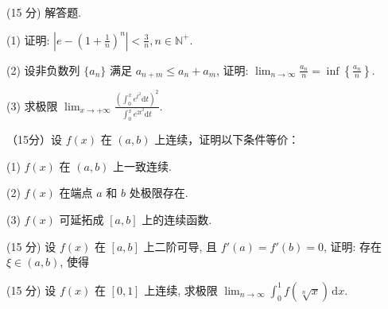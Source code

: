 \par{}
(15 分) 解答题.\par
(1) 证明: $\left|e - \left(1 + \frac{1}{n}\right)^n\right| < \frac{3}{n}, n \in \mathbb{N}^+$.\par
(2) 设非负数列 $\{a_{n}\}$ 满足 $a_{n + m} \leq a_{n} + a_{m}$, 证明: $\lim_{n \to \infty} \frac{a_{n}}{n} = \inf \left\{\frac{a_{n}}{n}\right\}$.\par
(3) 求极限 $\lim_{x\to +\infty}\frac{\left(\int_0^xe^{t^2}\mathrm{d}t\right)^2}{\int_0^xe^{2t^2}\mathrm{d}t}.$\par
\par{}
（15分）设 $f(x)$ 在 $(a,b)$ 上连续，证明以下条件等价：\par
(1) $f(x)$ 在 $(a, b)$ 上一致连续.\par
(2) $f(x)$ 在端点 $a$ 和 $b$ 处极限存在.\par
(3) $f(x)$ 可延拓成 $[a, b]$ 上的连续函数.\par
\par{}
\par{}
(15 分) 设 $f(x)$ 在 $[a, b]$ 上二阶可导, 且 $f'(a) = f'(b) = 0$, 证明: 存在 $\xi \in (a, b)$, 使得\par
\nopagebreak[4]
\par{}
(15 分) 设 $f(x)$ 在 $[0, 1]$ 上连续, 求极限 $\lim_{n \to \infty} \int_0^1 f(\sqrt[n]{x}) \, \mathrm{d}x$.\par
\par{}
\par{}
